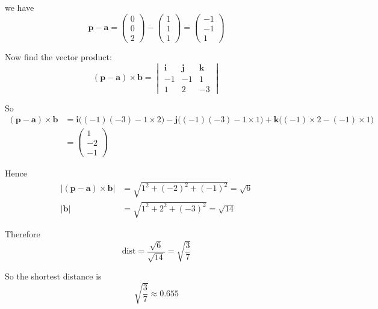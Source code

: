 \documentclass[leqno]{article}
\begin{document}
\begin{enumerate}[
  label=\textbf{\arabic*.},
  leftmargin=*,
  topsep=0pt,
  partopsep=0pt,
  parsep=0pt
]
\begin{djsSolution}
\begin{enumerate}[label=\textbf{(\alph*)}]
\begin{enumerate}[label=(\roman*)]
we have
\[
\mathbf p-\mathbf a=\begin{pmatrix}0\\0\\2\end{pmatrix}-\begin{pmatrix}1\\1\\1\end{pmatrix}=\begin{pmatrix}-1\\-1\\1\end{pmatrix}
\]

Now find the vector product:
\[
(\mathbf p-\mathbf a)\times\mathbf b
=
\begin{vmatrix}
\mathbf i & \mathbf j & \mathbf k \\
-1 & -1 & 1 \\
1 & 2 & -3
\end{vmatrix}
\]

So
\begin{align*}
(\mathbf p-\mathbf a)\times\mathbf b
&=\mathbf i\bigl((-1)(-3)-1\times 2\bigr)
-\mathbf j\bigl((-1)(-3)-1\times 1\bigr)
+\mathbf k\bigl((-1)\times 2-(-1)\times 1\bigr) \\
&=\begin{pmatrix}1\\-2\\-1\end{pmatrix}
\end{align*}

Hence
\begin{align*}
\left\lvert(\mathbf p-\mathbf a)\times\mathbf b\right\rvert
&=\sqrt{1^2+(-2)^2+(-1)^2}=\sqrt{6} \\
\left\lvert\mathbf b\right\rvert
&=\sqrt{1^2+2^2+(-3)^2}=\sqrt{14}
\end{align*}

Therefore
\[
\mathrm{dist}=\frac{\sqrt{6}}{\sqrt{14}}=\sqrt{\frac{3}{7}}
\]

So the shortest distance is
\[
\sqrt{\frac{3}{7}}\approx 0.655
\]
  \end{enumerate}
\end{enumerate}
\end{djsSolution}


\newpage

\questionitem


\end{enumerate}
\end{document}
